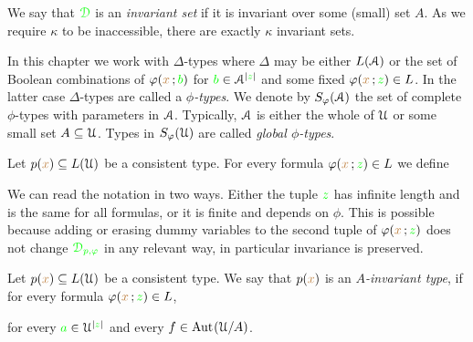 \documentclass[creche.tex]{subfiles}
\begin{document}
We say that ${\color{green}\EuScript D}$ is an \emph{invariant set\/} if it is invariant over some (small) set $A$.
As we require $\kappa$ to be inaccessible, there are exactly $\kappa$ invariant sets.

In this chapter we work with $\Delta$-types where $\Delta$ may be either $L(\EuScript A)$ or the set of Boolean combinations of $\varphi({\color{brown} x}\,;{\color{green} b})$ for ${\color{green} b}\in\EuScript A^{|{\color{green} z}|}$ and some fixed $\varphi({\color{brown} x}\,;{\color{green} z})\in L$.
In the latter case  $\Delta$-types are called a \emph{$\phi$-types}.
We denote by \emph{$S_{\varphi}(\EuScript A)$\/} the set of complete $\phi$-types with parameters in $\EuScript A$.
Typically, $\EuScript A$ is either the whole of $\EuScript U$ or some small set $A\subseteq\EuScript U$.
Types in \emph{$S_{\varphi}(\EuScript U)$\/} are called \emph{global $\phi$-types}.

% 



Let $p({\color{brown} x})\subseteq L(\EuScript U)$ be a consistent type.
For every formula $\varphi({\color{brown} x}\,;{\color{green} z})\in L$ we define


We can read the notation in two ways.
Either the tuple ${\color{green} z}$ has infinite length and is the same for all formulas, or it is finite and depends on $\phi$.
This is possible because adding or erasing dummy variables to the second tuple of $\varphi({\color{brown} x}\,;{\color{green} z})$ does not change ${\color{green}\EuScript D_{p,\varphi}}$ in any relevant way, in particular invariance is preserved.

Let $p({\color{brown} x})\subseteq L(\EuScript U)$ be a consistent type.
We say that $p({\color{brown} x})$ is an \emph{$A$-invariant type\/}, if for every formula $\varphi({\color{brown} x}\,;{\color{green} z})\in L$, 

\hfill for every ${\color{green} a}\in\EuScript U^{|{\color{green} z}|}$ and every $f\in\textrm{Aut\kern.15ex}(\EuScript U/A)$.
\end{document}
